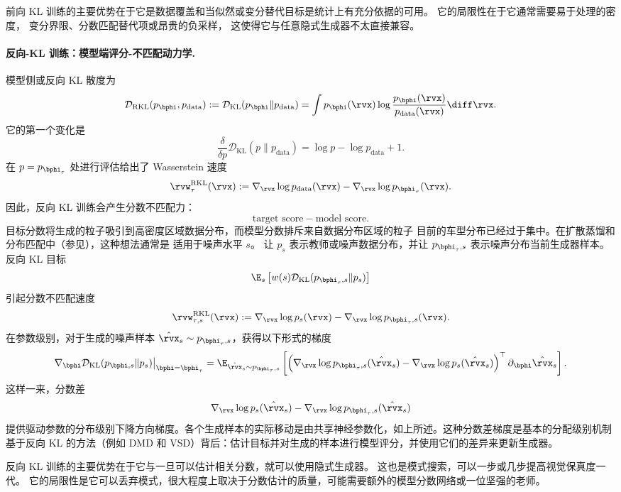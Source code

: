 前向 KL 训练的主要优势在于它是数据覆盖和当似然或变分替代目标是统计上有充分依据的可用。  它的局限性在于它通常需要易于处理的密度，
变分界限、分数匹配替代项或昂贵的负采样，
这使得它与任意隐式生成器不太直接兼容。

\paragraph{反向-KL 训练：模型端评分-不匹配动力学.}
模型侧或反向 KL 散度为
\[
    \mathcal{D}_{\mathrm{RKL}}(p_{\bphi},p_{\mathrm{data}})
    :=
    \mathcal D_{\mathrm{KL}}(p_{\bphi}\|p_{\mathrm{data}})
    =
    \int
    p_{\bphi}(\rvx)
    \log
    \frac{p_{\bphi}(\rvx)}
         {p_{\mathrm{data}}(\rvx)}
    \diff\rvx.
\]
它的第一个变化是
\[
    \frac{\delta}{\delta p}
    \mathcal D_{\mathrm{KL}}(p\|p_{\mathrm{data}})
    =
    \log p-\log p_{\mathrm{data}}+1.
\]
在 $p=p_{\bphi_\tau}$ 处进行评估给出了 Wasserstein 速度
\[
    \rvw_\tau^{\mathrm{RKL}}(\rvx)
    :=
    \nabla_{\rvx}\log p_{\mathrm{data}}(\rvx)
    -
    \nabla_{\rvx}\log p_{\bphi_\tau}(\rvx).
\]
因此，反向 KL 训练会产生分数不匹配力：
\[
    \text{target score}
    -
    \text{model score}.
\]
目标分数将生成的粒子吸引到高密度区域数据分布，而模型分数排斥来自数据分布区域的粒子
目前的车型分布已经过于集中。在扩散蒸馏和分布匹配中（参见），这种想法通常是
适用于噪声水平 $s$。  让 $p_s$ 表示教师或噪声数据分布，并让 $p_{\bphi_\tau,s}$ 表示噪声分布当前生成器样本。  反向 KL 目标
\[
    \E_s
    \left[
        w(s)
        \mathcal D_{\mathrm{KL}}(p_{\bphi_\tau,s}\|p_s)
    \right]
\]
引起分数不匹配速度
\[
    \rvw_{\tau,s}^{\mathrm{RKL}}(\rvx)
    :=
    \nabla_{\rvx}\log p_s(\rvx)
    -
    \nabla_{\rvx}\log p_{\bphi_\tau,s}(\rvx).
\]
在参数级别，对于生成的噪声样本
$\hat\rvx_s\sim p_{\bphi_\tau,s}$，获得以下形式的梯度
\[
    \nabla_{\bphi}
    \mathcal D_{\mathrm{KL}}(p_{\bphi,s}\|p_s)
    \big|_{\bphi=\bphi_\tau}
    =
    \E_{\hat\rvx_s\sim p_{\bphi_\tau,s}}
    \left[
        \left(
            \nabla_{\rvx}\log p_{\bphi_\tau,s}(\hat\rvx_s)
            -
            \nabla_{\rvx}\log p_s(\hat\rvx_s)
        \right)^\top
        \partial_{\bphi}\hat\rvx_s
    \right].
\]
这样一来，分数差
\[
\nabla_{\rvx}\log p_s(\hat\rvx_s)
-
\nabla_{\rvx}\log p_{\bphi_\tau,s}(\hat\rvx_s)
\]
提供驱动参数的分布级别下降方向梯度。各个生成样本的实际移动是由共享神经参数化，如上所述。这种分数差梯度是基本的分配级别机制基于反向 KL 的方法（例如 DMD 和 VSD）背后：估计目标并对生成的样本进行模型评分，并使用它们的差异来更新生成器。

反向 KL 训练的主要优势在于它与一旦可以估计相关分数，就可以使用隐式生成器。  这也是模式搜索，可以一步或几步提高视觉保真度一代。  它的局限性是它可以丢弃模式，很大程度上取决于分数估计的质量，可能需要额外的模型分数网络或一位坚强的老师。

